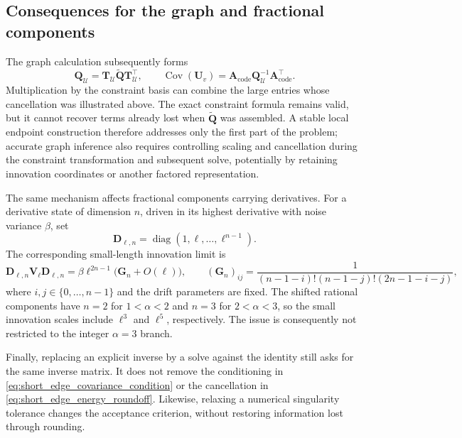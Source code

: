 \documentclass[11pt,a4paper]{article}
\theoremstyle{plain}
\theoremstyle{definition}
\begin{document}
\subsection{Consequences for the graph and fractional components}

The graph calculation subsequently forms
\begin{equation}
\mathbf Q_{\mathcal U}
=\mathbf T_{\mathcal U}\widetilde{\mathbf Q}
 \mathbf T_{\mathcal U}^{\top},
\qquad
\operatorname{Cov}(\mathbf U_v)
=\mathbf A_{\mathrm{code}}\mathbf Q_{\mathcal U}^{-1}
 \mathbf A_{\mathrm{code}}^\top.
\end{equation}
Multiplication by the constraint basis can combine the large entries
whose cancellation was illustrated above. The exact constraint formula
remains valid, but it cannot recover terms already lost when
$\widetilde{\mathbf Q}$ was assembled. A stable local endpoint
construction therefore addresses only the first part of the problem;
accurate graph inference also requires controlling scaling and
cancellation during the constraint transformation and subsequent solve,
potentially by retaining innovation coordinates or another factored
representation.

The same mechanism affects fractional components carrying derivatives.
For a derivative state of dimension $n$, driven in its highest
derivative with noise variance $\beta$, set
\begin{equation}
\mathbf D_{\ell,n}=\operatorname{diag}(1,\ell,\ldots,\ell^{n-1}).
\end{equation}
The corresponding small-length innovation limit is
\begin{equation}
\mathbf D_{\ell,n}\mathbf V_\ell\mathbf D_{\ell,n}
=\beta\ell^{2n-1}\bigl(\mathbf G_n+O(\ell)\bigr),
\qquad
(\mathbf G_n)_{ij}
=\frac{1}{(n-1-i)!(n-1-j)!(2n-1-i-j)},
\label{eq:short_edge_general_innovation}
\end{equation}
where $i,j\in\{0,\ldots,n-1\}$ and the drift parameters are fixed.
The shifted rational components have $n=2$ for $1<\alpha<2$ and
$n=3$ for $2<\alpha<3$, so the small innovation scales include
$\ell^3$ and $\ell^5$, respectively. The issue is consequently not
restricted to the integer $\alpha=3$ branch.

Finally, replacing an explicit inverse by a solve against the identity
still asks for the same inverse matrix. It does not remove the
conditioning in \eqref{eq:short_edge_covariance_condition} or the
cancellation in \eqref{eq:short_edge_energy_roundoff}. Likewise,
relaxing a numerical singularity tolerance changes the acceptance
criterion, without restoring information lost through rounding.
\end{document}
